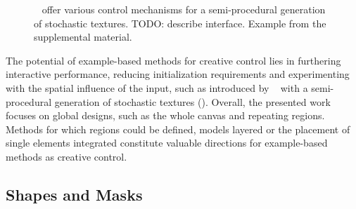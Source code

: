 \begin{figure}[H]
    \centering
    \label{fig:guehl_2020_stu}
    \caption{\citeauthor*{guehl_2020_stu}~\cite{guehl_2020_stu} offer various control mechanisms for a semi-procedural generation of stochastic textures. TODO: describe interface. Example from the supplemental material. \color{red}{Status rights: not started.}}
\end{figure}

The potential of example-based methods for creative control lies in furthering interactive performance, reducing initialization requirements and experimenting with the spatial influence of the input, such as introduced by \citeauthor*{guehl_2020_stu}~\cite{guehl_2020_stu} with a semi-procedural generation of stochastic textures (). Overall, the presented work focuses on global designs, such as the whole canvas and repeating regions. Methods for which regions could be defined, models layered or the placement of single elements integrated constitute valuable directions for example-based methods as creative control.



\subsection{Shapes and Masks}
\label{subsubsec:analysis_creative_means_shapes}

